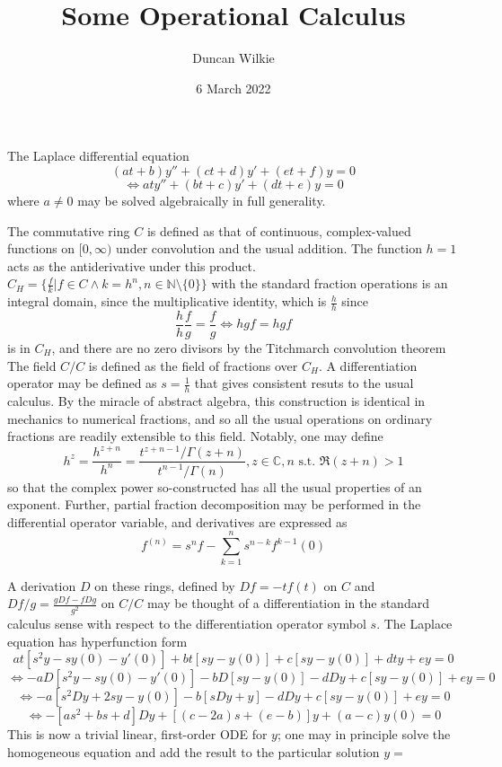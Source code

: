 \documentclass{article}
\title{Some Operational Calculus}
\author{Duncan Wilkie}
\date{6 March 2022}
\begin{document}
\maketitle

\section{}
The Laplace differential equation
\[(at+b)y''+(ct+d)y'+(et+f)y=0\]
\[\Leftrightarrow aty''+(bt+c)y'+(dt+e)y=0\]
where $a\neq 0$ may be solved algebraically in full generality.

The commutative ring $C$ is defined as that of continuous, complex-valued functions on $[0,\infty)$ under convolution and the usual addition. The function $h=1$ acts as the antiderivative under this product.
$C_{H}=\{\frac{f}{k} | f\in C\land k=h^{n}, n\in\mathbb{N}\setminus\{0\}\}$ with the standard fraction operations is an integral domain, since the multiplicative identity, which is $\frac{h}{h}$ since
\[\frac{h}{h}\frac{f}{g}=\frac{f}{g}\Leftrightarrow hgf=hgf\]
is in $C_{H}$, and there are no zero divisors by the Titchmarch convolution theorem
The field $C/C$ is defined as the field of fractions over $C_{H}$.  A differentiation operator may be defined as $s=\frac{1}{h}$ that gives consistent resuts to the usual calculus. By the miracle of abstract algebra, this construction is identical in mechanics to numerical fractions, and so all the usual operations on ordinary fractions are readily extensible to this field. Notably, one may define
\[h^{z}=\frac{h^{z+n}}{h^{n}}=\frac{t^{z+n-1}/\Gamma(z+n)}{t^{n-1}/\Gamma(n)}, z\in\mathbb{C}, n\textrm{ s.t. } \Re(z+n) > 1\]
so that the complex power so-constructed has all the usual properties of an exponent. Further, partial fraction decomposition may be performed in the differential operator variable, and derivatives are expressed as
\[f^{(n)}=s^{n}f-\sum_{k=1}^{n}s^{n-k}f^{k-1}(0)\]

A derivation $D$ on these rings, defined by $Df=-tf(t)$ on $C$ and $Df/g=\frac{gDf-fDg}{g^{2}}$ on $C/C$ may be thought of a differentiation in the standard calculus sense with respect to the differentiation operator symbol $s$. The Laplace equation has hyperfunction form
\[at[s^{2}y-sy(0)-y'(0)]+bt[sy-y(0)]+c[sy-y(0)]+dty+ey=0\]
\[\Leftrightarrow -aD[s^{2}y-sy(0)-y'(0)]-bD[sy-y(0)]-dDy+c[sy-y(0)]+ey=0\]
\[\Leftrightarrow -a[s^{2}Dy+2sy-y(0)]-b[sDy+y]-dDy+c[sy-y(0)]+ey=0\]
\[\Leftrightarrow -[as^{2}+bs+d]Dy+[(c-2a)s+(e-b)]y+(a-c)y(0)=0\]
This is now a trivial linear, first-order ODE for $y$; one may in principle solve the homogeneous equation and add the result to the particular solution $y=$
\end{document}
